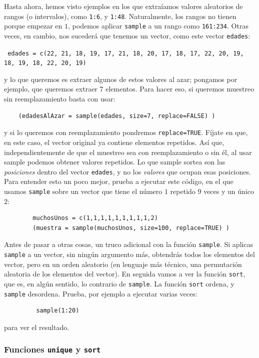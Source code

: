 \documentclass[10pt,a4paper]{article}\usepackage[]{graphicx}\usepackage[]{color}
\newcounter {cont01}
\begin{document}
Hasta ahora, hemos visto ejemplos en los que extraíamos valores aleatorios de rangos (o intervalos), como {\tt 1:6}, y {\tt 1:48}. Naturalmente, los rangos no tienen porque empezar en $1$, podemos aplicar {\tt sample} a un rango como {\tt 161:234}. Otras veces, en cambio, nos sucederá que tenemos un vector, como este vector {\tt edades}:
\begin{center}
{\tt
edades = c(22, 21, 18, 19, 17, 21, 18, 20, 17, 18, 17, 22, 20, 19, 18, 19, 18, 22, 20, 19)
}
\end{center}
y lo que queremos es extraer algunos  de estos valores al azar; pongamos por ejemplo, que queremos extraer $7$ elementos. Para hacer eso, si queremos muestreo sin reemplazamiento basta con usar:
\begin{verbatim}
    (edadesAlAzar = sample(edades, size=7, replace=FALSE) )
\end{verbatim}
y si lo queremos con reemplazamiento pondremos {\tt replace=TRUE}. Fíjate en que, en este caso, el vector original ya contiene elementos repetidos. Así que, independientemente de que el muestreo sea con reemplazamiento o sin él, al usar sample podemos obtener valores repetidos. Lo que sample sortea son las {\em posiciones} dentro del vector {\tt edades}, y no los {\em valores} que ocupan esas posiciones.  Para entender esto un poco mejor, prueba a ejecutar este código, en el que usamos {\tt sample} sobre un vector que tiene el número $1$ repetido $9$ veces y un único $2$:
\begin{verbatim}
        muchosUnos = c(1,1,1,1,1,1,1,1,1,2)
        (muestra = sample(muchosUnos, size=100, replace=TRUE) )
\end{verbatim}

Antes de pasar a otras cosas, un truco adicional con la función {\tt sample}. Si aplicas {\tt sample} a un vector, sin ningún argumento más, obtendrás todos los elementos del vector, pero en un orden aleatorio (en lenguaje más técnico, una permutación aleatoria de los elementos del vector). En seguida vamos a ver la función {\tt sort}, que es, en algún sentido, lo contrario de {\tt sample}. La función {\tt sort} ordena, y {\tt sample} desordena. Prueba, por ejemplo a ejecutar varias veces:
\begin{verbatim}
         sample(1:20)
\end{verbatim}
para ver el resultado.


\subsubsection*{Funciones {\tt unique} y {\tt sort}}
\end{document}
